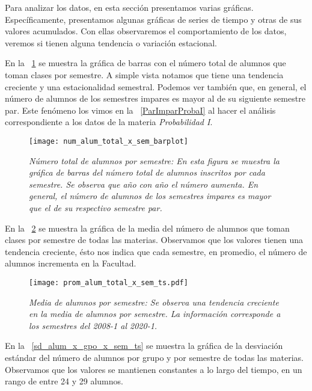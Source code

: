 Para analizar los datos, en esta sección presentamos varias gráficas. Específicamente, presentamos algunas gráficas de series de tiempo y otras de sus valores acumulados. Con ellas observaremos el comportamiento de los datos, veremos si tienen alguna tendencia o variación estacional.

En la \figurename{~\ref{TotalAlumBarras}} se muestra la gráfica de barras con el número total de alumnos que toman clases por semestre. A simple vista notamos que tiene una tendencia creciente y una estacionalidad semestral. Podemos ver también que, en general, el número de alumnos de los semestres impares es mayor al de su siguiente semestre par. Este fenómeno los vimos en la \figurename{~\ref{ParImparProbaI}} al hacer el análisis correspondiente a los datos de la materia \textit{Probabilidad I}.

\begin{figure}[H]
\centering
\texttt{[image: num\_alum\_total\_x\_sem\_barplot]} %
\caption[\textit{Número total de alumnos por semestre}]{\textit{Número total de alumnos por semestre: En esta figura se muestra la gráfica de barras del número total de alumnos inscritos por cada semestre. Se observa que año con año el número aumenta. En general, el número de alumnos de los semestres impares es mayor que el de su respectivo semestre par.}}\label{TotalAlumBarras}
\end{figure}

En la \figurename{~\ref{prom_alum_x_sem_ts}} se muestra la gráfica de la media del número de alumnos que toman clases por semestre de todas las materias. Observamos que los valores tienen una tendencia creciente, ésto nos indica que cada semestre, en promedio, el número de alumnos incrementa en la Facultad.

\begin{figure}[H]
\centering
\texttt{[image: prom\_alum\_total\_x\_sem\_ts.pdf]} %
\caption[\textit{Media de alumnos por semestre}]{\textit{Media de alumnos por semestre: Se observa una tendencia creciente en la media de alumnos por semestre. La información corresponde a los semestres del 2008-1 al 2020-1.}}\label{prom_alum_x_sem_ts}
\end{figure}

En la \figurename{~\ref{sd_alum_x_gpo_x_sem_ts}} se muestra la gráfica de la desviación estándar del número de alumnos por grupo y por semestre de todas las materias. Observamos que los valores se mantienen constantes a lo largo del tiempo, en un rango de entre 24 y 29 alumnos.

